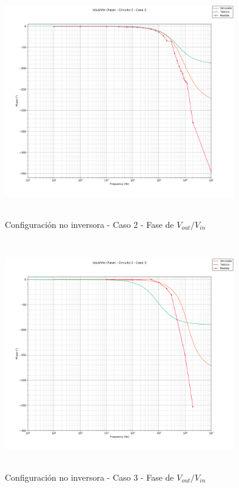 \begin{figure}[H] %
	\centering
	\includegraphics[width=10cm,height=10cm,keepaspectratio]{../EJ1/00GRAFICOS/c2c2/c2c2voviFASE.png}
	\caption{Configuración no inversora - Caso 2 - Fase de $V_{out}/V_{in}$}
	\label{c2c2voviP}
\end{figure}


\begin{figure}[H] %
	\centering
	\includegraphics[width=10cm,height=10cm,keepaspectratio]{../EJ1/00GRAFICOS/c2c3/c2c3voviFASE.png}
	\caption{Configuración no inversora - Caso 3 - Fase de $V_{out}/V_{in}$}
	\label{c2c3voviP}
\end{figure}


